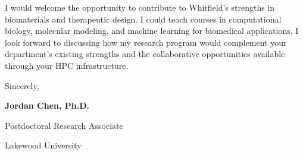 \documentclass{cv} %
\begin{document}
I would welcome the opportunity to contribute to Whitfield's strengths in biomaterials and therapeutic design. I could teach courses in computational biology, molecular modeling, and machine learning for biomedical applications. I look forward to discussing how my research program would complement your department's existing strengths and the collaborative opportunities available through your HPC infrastructure.

\vspace{0.6em}
{\setlength{\parskip}{0pt}
Sincerely,\par\vspace{0.4em}
{\bfseries\color{black}Jordan Chen, Ph.D.}\par
{\color{notiongray}Postdoctoral Research Associate}\par
{\color{notiongray}Lakewood University}\par}
\end{document}
